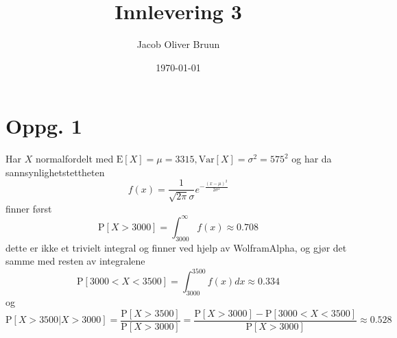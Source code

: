 \documentclass{report}
\title{Innlevering 3}
\author{Jacob Oliver Bruun}
\date{\today}
\newcommand{\nbrack}[1]{\left( #1 \right)}
\newcommand{\bbrack}[1]{\left[ #1 \right]}
\newcommand{\Var}[1]{\text{Var} \bbrack{ #1 }}
\newcommand{\std}[1]{\text{E} \bbrack{ #1 }}
\newcommand{\Prob}[1]{\text{P} \bbrack{ #1 }}
\begin{document}
\section*{Oppg. 1}
Har $X$ normalfordelt med $\std{X} = \mu = 3315, \Var{X} = \sigma^{2} = 575^{2}$ og har da sannsynlighetstettheten
\begin{equation}
  \label{eq:2}
  f(x) = \frac{1}{\sqrt{2\pi} \sigma} e^{- \frac{\nbrack{x - \mu}^{2}}{2\sigma^{2}}}
\end{equation}
finner først
\begin{equation}
  \label{eq:3}
  \Prob{X>3000} = \int_{3000}^{\infty} f(x) \approx 0.708
\end{equation}
dette er ikke et trivielt integral og finner ved hjelp av WolframAlpha, og gjør det samme med resten av integralene
\begin{equation}
  \label{eq:5}
  \Prob{3000 < X < 3500} = \int_{3000}^{3500} f(x) dx \approx 0.334
\end{equation}
og
\begin{equation}
  \label{eq:6}
  \Prob{X>3500 | X > 3000} =\frac{\Prob{X > 3500}}{\Prob{X > 3000}} = \frac{\Prob{X > 3000} - \Prob{3000 < X < 3500}}{\Prob{X > 3000}} \approx 0.528
\end{equation}
\end{document}
